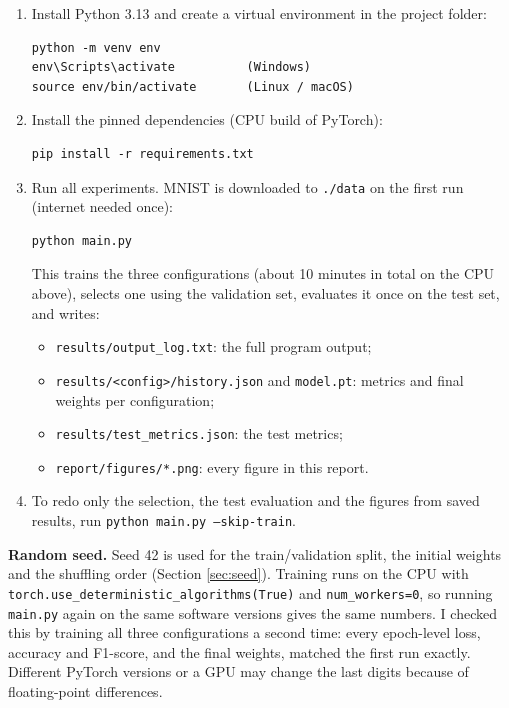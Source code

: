 \begin{enumerate}
  \item Install Python 3.13 and create a virtual environment in the
        project folder:
\begin{lstlisting}[language={}, numbers=none]
python -m venv env
env\Scripts\activate          (Windows)
source env/bin/activate       (Linux / macOS)
\end{lstlisting}
  \item Install the pinned dependencies (CPU build of PyTorch):
\begin{lstlisting}[language={}, numbers=none]
pip install -r requirements.txt
\end{lstlisting}
  \item Run all experiments. MNIST is downloaded to \texttt{./data} on
        the first run (internet needed once):
\begin{lstlisting}[language={}, numbers=none]
python main.py
\end{lstlisting}
        This trains the three configurations (about 10 minutes in total on
        the CPU above), selects one using the validation set, evaluates
        it once on the test set, and writes:
        \begin{itemize}
          \item \texttt{results/output\_log.txt}: the full program output;
          \item \texttt{results/<config>/history.json} and
                \texttt{model.pt}: metrics and final weights per
                configuration;
          \item \texttt{results/test\_metrics.json}: the test metrics;
          \item \texttt{report/figures/*.png}: every figure in this report.
        \end{itemize}
  \item To redo only the selection, the test evaluation and the figures
        from saved results, run \texttt{python main.py --skip-train}.
\end{enumerate}

\textbf{Random seed.} Seed 42 is used for the train/validation split,
the initial weights and the shuffling order (Section \ref{sec:seed}).
Training runs on the CPU with
\texttt{torch.use\_deterministic\_algorithms(True)} and
\texttt{num\_workers=0}, so running \texttt{main.py} again on the same
software versions gives the same numbers. I checked this by training all
three configurations a second time: every epoch-level loss, accuracy and
F1-score, and the final weights, matched the first run exactly.
Different PyTorch versions or a GPU may change the last digits because
of floating-point differences.
